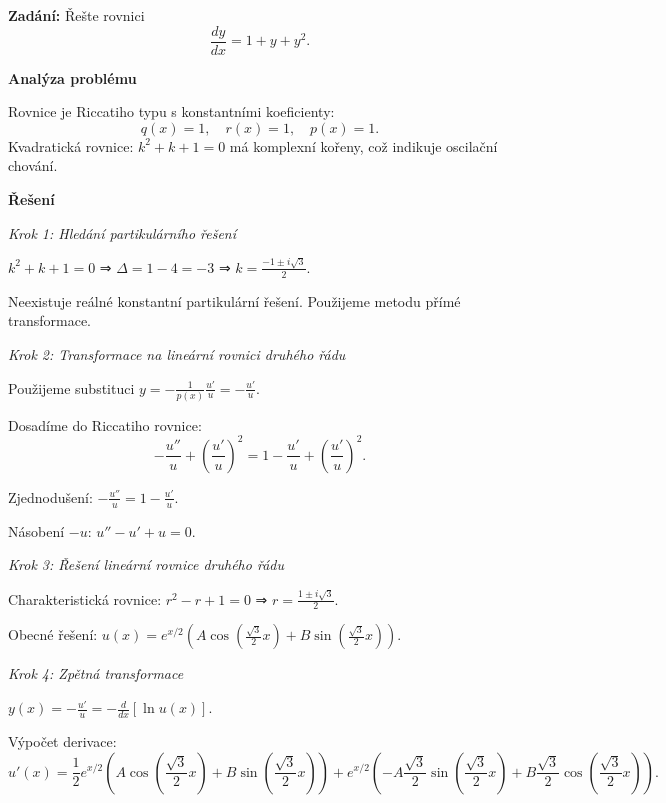 \begin{example}
    \label{ex:a1-slozity-komplexni}
    
    \noindent\textbf{Zadání:} Řešte rovnici
    \[
    \frac{dy}{dx} = 1 + y + y^2.
    \]
    
    \vspace{1.5\baselineskip}
    
    \noindent\textbf{Analýza problému}
    
    \noindent Rovnice je Riccatiho typu s konstantními koeficienty:
    \[
    q(x) = 1, \quad r(x) = 1, \quad p(x) = 1.
    \]
    Kvadratická rovnice: $k^2 + k + 1 = 0$ má komplexní kořeny, což indikuje oscilační chování.
    
    \vspace{1.5\baselineskip}
    
    \noindent\textbf{Řešení}
    
    \noindent\textit{Krok 1: Hledání partikulárního řešení}
    
    $k^2 + k + 1 = 0$ ⇒ $\Delta = 1 - 4 = -3$ ⇒ $k = \frac{-1 \pm i\sqrt{3}}{2}$.
    
    Neexistuje reálné konstantní partikulární řešení. Použijeme metodu přímé transformace.
    
    \noindent\textit{Krok 2: Transformace na lineární rovnici druhého řádu}
    
    Použijeme substituci $y = -\frac{1}{p(x)}\frac{u'}{u} = -\frac{u'}{u}$.
    
    Dosadíme do Riccatiho rovnice:
    \[
    -\frac{u''}{u} + \left(\frac{u'}{u}\right)^2 = 1 - \frac{u'}{u} + \left(\frac{u'}{u}\right)^2.
    \]
    
    Zjednodušení: $-\frac{u''}{u} = 1 - \frac{u'}{u}$.
    
    Násobení $-u$: $u'' - u' + u = 0$.
    
    \noindent\textit{Krok 3: Řešení lineární rovnice druhého řádu}
    
    Charakteristická rovnice: $r^2 - r + 1 = 0$ ⇒ $r = \frac{1 \pm i\sqrt{3}}{2}$.
    
    Obecné řešení: $u(x) = e^{x/2}\left(A\cos\left(\frac{\sqrt{3}}{2}x\right) + B\sin\left(\frac{\sqrt{3}}{2}x\right)\right)$.
    
    \noindent\textit{Krok 4: Zpětná transformace}
    
    $y(x) = -\frac{u'}{u} = -\frac{d}{dx}[\ln u(x)]$.
    
    Výpočet derivace:
    \[
    u'(x) = \frac{1}{2}e^{x/2}\left(A\cos\left(\frac{\sqrt{3}}{2}x\right) + B\sin\left(\frac{\sqrt{3}}{2}x\right)\right) + e^{x/2}\left(-A\frac{\sqrt{3}}{2}\sin\left(\frac{\sqrt{3}}{2}x\right) + B\frac{\sqrt{3}}{2}\cos\left(\frac{\sqrt{3}}{2}x\right)\right).
    \]
    

\end{example}
